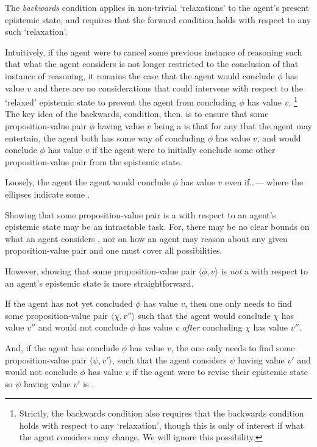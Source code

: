 \begin{note}[Backwards]
  The \emph{backwards} condition applies in non-trivial `relaxations' to the agent's present epistemic state, and requires that the forward condition holds with respect to any such `relaxation'.

  Intuitively, if the agent were to cancel some previous instance of reasoning such that what the agent considers \epVAd{} is not longer restricted to the conclusion of that instance of reasoning, it remains the case that the agent would conclude \(\phi\) has value \(v\) and there are no considerations that could intervene with respect to the `relaxed' epistemic state to prevent the agent from concluding \(\phi\) has value \(v\).\nolinebreak
  \footnote{
    Strictly, the backwards condition also requires that the backwards condition holds with respect to any `relaxation', though this is only of interest if what the agent considers \epPAd{} may change.
    We will ignore this possibility.
  }
  The key idea of the backwards, condition, then, is to ensure that some proposition-value pair \(\phi\) having value \(v\) being a \sink{} is that for any \epPN{} that the agent may entertain, the agent both has some way of concluding \(\phi\) has value \(v\), and would conclude \(\phi\) has value \(v\) if the agent were to initially conclude some other proposition-value pair from the epistemic state.

  Loosely, the agent the agent would conclude \(\phi\) has value \(v\) even if\dots\space --- where the ellipses indicate some \epPN{}.
\end{note}

\begin{note}
  Showing that some proposition-value pair is a \sink{} with respect to an agent's epistemic state may be an intractable task.
  For, there may be no clear bounds on what an agent considers \epPAd{}, nor on how an agent may reason about any given proposition-value pair and one must cover all possibilities.

  However, showing that some proposition-value pair \(\langle \phi,v \rangle\) is \emph{not} a \sink{} with respect to an agent's epistemic state is more straightforward.

  If the agent has not yet concluded \(\phi\) has value \(v\), then one only needs to find some proposition-value pair \(\langle \chi,v'' \rangle\) such that the agent would conclude \(\chi\) has value \(v''\) and would not conclude \(\phi\) has value \(v\) \emph{after} concluding \(\chi\) has value \(v''\).

  And, if the agent has conclude \(\phi\) has value \(v\), the one only needs to find some proposition-value pair \(\langle \psi,v' \rangle\), such that the agent considers \(\psi\) having value \(v'\) \epPAd{} and would not conclude \(\phi\) has value \(v\) if the agent were to revise their epistemic state so \(\psi\) having value \(v'\) is \epVAd{}.
\end{note}

